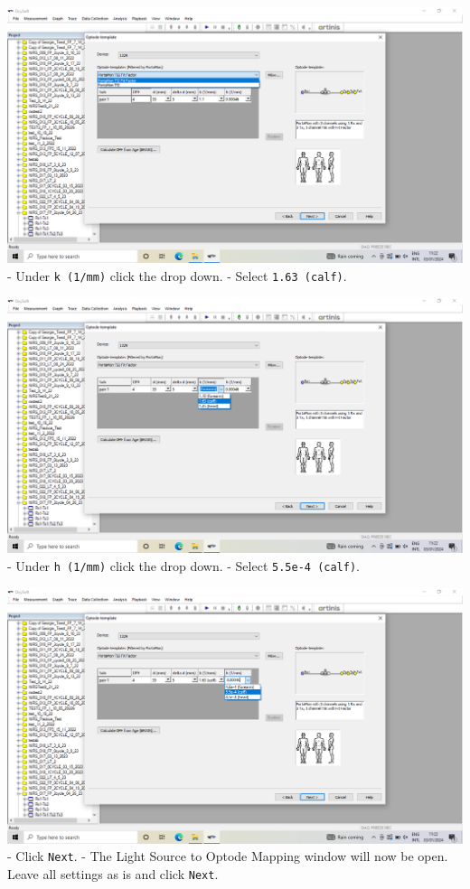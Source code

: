 \documentclass[
]{book}
\begin{document}
\includegraphics[width=1\linewidth]{images/startnewmeasurement/10_select_tsiff}
- Under \texttt{k\ (1/mm)} click the drop down.
- Select \texttt{1.63\ (calf)}.

\includegraphics[width=1\linewidth]{images/startnewmeasurement/11_k_calf}
- Under \texttt{h\ (1/mm)} click the drop down.
- Select \texttt{5.5e-4\ (calf)}.

\includegraphics[width=1\linewidth]{images/startnewmeasurement/12_h_calf}
- Click \texttt{Next}.
- The Light Source to Optode Mapping window will now be open. Leave all settings as is and click \texttt{Next}.
\end{document}
